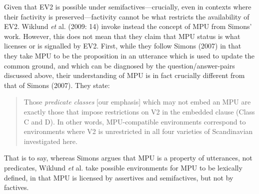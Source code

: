 \documentclass[output=paper]{LSP/langsci}
\begin{document}
\begin{exe}
\end{exe}

Given that EV2 is possible under semifactives---crucially, even in contexts where their factivity is preserved---factivity cannot be what restricts the availability of EV2. Wiklund \textit{et} al. (2009: 14) invoke instead the concept of MPU from Simons' work. However, this does not mean that they claim that MPU status is what licenses or is signalled by EV2. First,  while they follow Simons (2007) in that they take MPU to be the proposition in an utterance which is used to update the common ground, and which can be diagnosed by the question/answer-pairs discussed above, their understanding of MPU is in fact crucially different from that of Simons (2007). They state:

\begin{quote}
Those \textit{predicate classes} [our emphasis] which may not embed an MPU are exactly those that impose restrictions on V2 in the embedded clause (Class C and D). In other words, MPU-compatible environments correspond to environments where V2 is unrestricted in all four varieties of Scandinavian investigated here. \citep[1927]{wiklund-etal09} 
\end{quote}
That is to say, whereas Simons argues that MPU is a property of utterances, not predicates, Wiklund \textit{et} al. take possible environments for MPU to be lexically defined, in that MPU is licensed by assertives and semifactives, but not by factives. 
\end{document}
